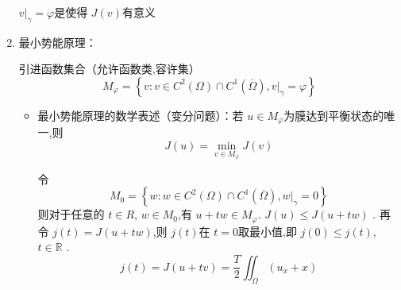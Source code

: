 \documentclass[../../PDE.tex]{subfiles}
\begin{document}
\begin{enumerate}
    \(  v| _{ \gamma }=  \varphi   \)是使得 \(  J\left( v \right)   \)有意义  


    
    \item 最小势能原理：
    
    引进函数集合（允许函数类,容许集） \[
    M_{ \varphi } =  \left\{ v : v \in C^{2}\left(  \Omega  \right)\cap C^{1}\left(  \overline{ \Omega } \right),  v|_{ \gamma }=  \varphi    \right\}
    \]
    \begin{itemize}
        \item 最小势能原理的数学表述（变分问题）：若 \(  u \in M_{ \varphi }  \)为膜达到平衡状态的唯一,则 \[
        J\left( u \right)=  \min _{v \in M_{ \varphi }}J\left( v \right)  
        \] 

        令 \[
        M_{0}=  \left\{ w: w \in C^{2}\left(  \Omega  \right)\cap C^{1}\left(  \overline{ \Omega } \right), w |_{ \gamma }= 0   \right\}
        \]则对于任意的 \(  t \in R  \), \(  w\in M_{0}  \),有 \(  u +  tw \in M_{ \varphi }  \).   \(  J\left( u \right)\le J\left( u+ tw \right)    \) .
        再令 \(  j\left( t \right) =  J\left( u+ tw \right)    \),则 \(  j\left( t \right)   \)在 \(  t =  0  \)取最小值,即 \(  j\left( 0 \right)\le j\left( t \right)    \), \(  t \in \mathbb{R}   \) .
         \[
         j\left( t \right) =   J\left( u+ tv \right) =   \frac{T }{2 } \iint_{ \Omega }\left( u_{x}+ x \right)    
         \]    
    \end{itemize}
    
\end{enumerate}
\end{document}
